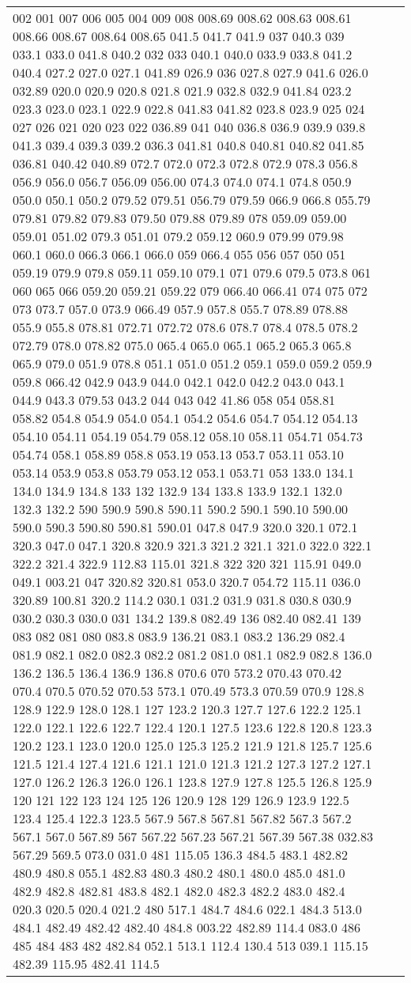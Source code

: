 \begin{longtable}{|L{.1in}|L{.6in}||L{5.65in}|}
002 001 007 006 005 004 009 008 008.69 008.62 008.63 008.61 008.66 008.67 008.64 008.65 041.5 041.7 041.9 037 040.3 039 033.1 033.0 041.8 040.2 032 033 040.1 040.0 033.9 033.8 041.2 040.4 027.2 027.0 027.1 041.89 026.9 036 027.8 027.9 041.6 026.0 032.89 020.0 020.9 020.8 021.8 021.9 032.8 032.9 041.84 023.2 023.3 023.0 023.1 022.9 022.8 041.83 041.82 023.8 023.9 025 024 027 026 021 020 023 022 036.89 041 040 036.8 036.9 039.9 039.8 041.3 039.4 039.3 039.2 036.3 041.81 040.8 040.81 040.82 041.85 036.81 040.42 040.89 072.7 072.0 072.3 072.8 072.9 078.3 056.8 056.9 056.0 056.7 056.09 056.00 074.3 074.0 074.1 074.8 050.9 050.0 050.1 050.2 079.52 079.51 056.79 079.59 066.9 066.8 055.79 079.81 079.82 079.83 079.50 079.88 079.89 078 059.09 059.00 059.01 051.02 079.3 051.01 079.2 059.12 060.9 079.99 079.98 060.1 060.0 066.3 066.1 066.0 059 066.4 055 056 057 050 051 059.19 079.9 079.8 059.11 059.10 079.1 071 079.6 079.5 073.8 061 060 065 066 059.20 059.21 059.22 079 066.40 066.41 074 075 072 073 073.7 057.0 073.9 066.49 057.9 057.8 055.7 078.89 078.88 055.9 055.8 078.81 072.71 072.72 078.6 078.7 078.4 078.5 078.2 072.79 078.0 078.82 075.0 065.4 065.0 065.1 065.2 065.3 065.8 065.9 079.0 051.9 078.8 051.1 051.0 051.2 059.1 059.0 059.2 059.9 059.8 066.42 042.9 043.9 044.0 042.1 042.0 042.2 043.0 043.1 044.9 043.3 079.53 043.2 044 043 042 41.86 058 054 058.81 058.82 054.8 054.9 054.0 054.1 054.2 054.6 054.7 054.12 054.13 054.10 054.11 054.19 054.79 058.12 058.10 058.11 054.71 054.73 054.74 058.1 058.89 058.8 053.19 053.13 053.7 053.11 053.10 053.14 053.9 053.8 053.79 053.12 053.1 053.71 053 133.0 134.1 134.0 134.9 134.8 133 132 132.9 134 133.8 133.9 132.1 132.0 132.3 132.2 590 590.9 590.8 590.11 590.2 590.1 590.10 590.00 590.0 590.3 590.80 590.81 590.01 047.8 047.9 320.0 320.1 072.1 320.3 047.0 047.1 320.8 320.9 321.3 321.2 321.1 321.0 322.0 322.1 322.2 321.4 322.9 112.83 115.01 321.8 322 320 321 115.91 049.0 049.1 003.21 047 320.82 320.81 053.0 320.7 054.72 115.11 036.0 320.89 100.81 320.2 114.2 030.1 031.2 031.9 031.8 030.8 030.9 030.2 030.3 030.0 031 134.2 139.8 082.49 136 082.40 082.41 139 083 082 081 080 083.8 083.9 136.21 083.1 083.2 136.29 082.4 081.9 082.1 082.0 082.3 082.2 081.2 081.0 081.1 082.9 082.8 136.0 136.2 136.5 136.4 136.9 136.8 070.6 070 573.2 070.43 070.42 070.4 070.5 070.52 070.53 573.1 070.49 573.3 070.59 070.9 128.8 128.9 122.9 128.0 128.1 127 123.2 120.3 127.7 127.6 122.2 125.1 122.0 122.1 122.6 122.7 122.4 120.1 127.5 123.6 122.8 120.8 123.3 120.2 123.1 123.0 120.0 125.0 125.3 125.2 121.9 121.8 125.7 125.6 121.5 121.4 127.4 121.6 121.1 121.0 121.3 121.2 127.3 127.2 127.1 127.0 126.2 126.3 126.0 126.1 123.8 127.9 127.8 125.5 126.8 125.9 120 121 122 123 124 125 126 120.9 128 129 126.9 123.9 122.5 123.4 125.4 122.3 123.5 567.9 567.8 567.81 567.82 567.3 567.2 567.1 567.0 567.89 567 567.22 567.23 567.21 567.39 567.38 032.83 567.29 569.5 073.0 031.0 481 115.05 136.3 484.5 483.1 482.82 480.9 480.8 055.1 482.83 480.3 480.2 480.1 480.0 485.0 481.0 482.9 482.8 482.81 483.8 482.1 482.0 482.3 482.2 483.0 482.4 020.3 020.5 020.4 021.2 480 517.1 484.7 484.6 022.1 484.3 513.0 484.1 482.49 482.42 482.40 484.8 003.22 482.89 114.4 083.0 486 485 484 483 482 482.84 052.1 513.1 112.4 130.4 513 039.1 115.15 482.39 115.95 482.41 114.5 
\end{longtable}
